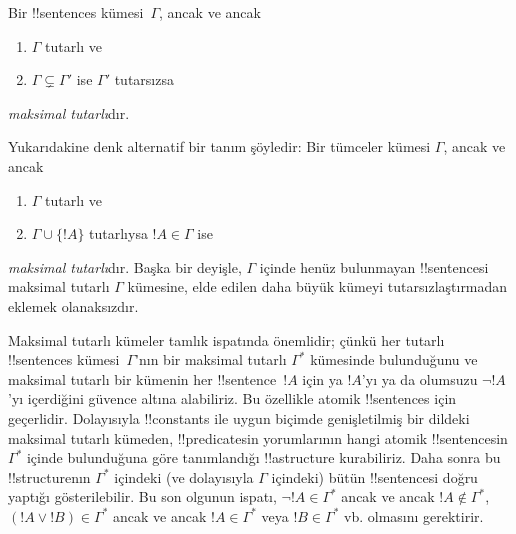 \documentclass[../../../include/open-logic-section]{subfiles}
\begin{document}

\begin{defn}
Bir !!{sentence}s kümesi~$\Gamma$, ancak ve ancak
\begin{enumerate}
\item $\Gamma$ tutarlı ve
\item $\Gamma \subsetneq \Gamma'$ ise $\Gamma'$ tutarsızsa
\end{enumerate}
\emph{maksimal tutarlı}dır.
\end{defn}

\begin{explain}
Yukarıdakine denk alternatif bir tanım şöyledir: Bir tümceler kümesi
$\Gamma$, ancak ve ancak
\begin{enumerate}
\item $\Gamma$ tutarlı ve
\item $\Gamma \cup \{ !A \}$ tutarlıysa $!A \in \Gamma$ ise
\end{enumerate}
\emph{maksimal tutarlı}dır. Başka bir deyişle, $\Gamma$ içinde henüz
bulunmayan !!{sentence}s{}i maksimal tutarlı $\Gamma$ kümesine, elde edilen
daha büyük kümeyi tutarsızlaştırmadan eklemek olanaksızdır.
\end{explain}

\begin{explain}
Maksimal tutarlı kümeler tamlık ispatında önemlidir; çünkü her tutarlı
!!{sentence}s kümesi~$\Gamma$'nın bir maksimal tutarlı $\Gamma^*$ kümesinde
bulunduğunu ve maksimal tutarlı bir kümenin her !!{sentence}~$!A$ için ya
$!A$'yı ya da olumsuzu $\lnot !A$'yı içerdiğini güvence altına alabiliriz.
Bu özellikle atomik !!{sentence}s için geçerlidir. Dolayısıyla !!{constant}s
ile uygun biçimde genişletilmiş bir dildeki maksimal tutarlı kümeden,
!!{predicate}s{}in yorumlarının hangi atomik !!{sentence}s{}in $\Gamma^*$ içinde
bulunduğuna göre tanımlandığı !!a{structure} kurabiliriz. Daha sonra bu
!!{structure}{}nın $\Gamma^*$ içindeki (ve dolayısıyla $\Gamma$ içindeki) bütün
!!{sentence}s{}i doğru yaptığı gösterilebilir. Bu son olgunun ispatı,
$\lnot !A \in \Gamma^*$ ancak ve ancak $!A \notin \Gamma^*$,
$(!A \lor !B) \in \Gamma^*$ ancak ve ancak $!A \in \Gamma^*$ veya
$!B \in \Gamma^*$ vb. olmasını gerektirir.
\end{explain}
\end{document}
